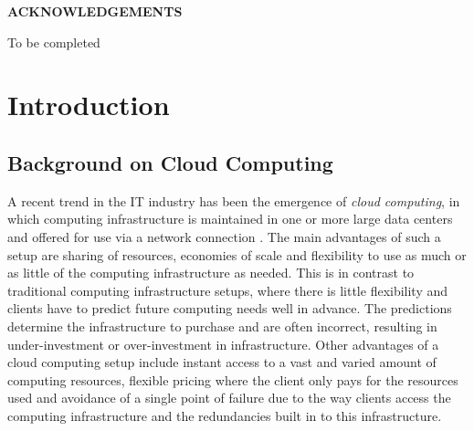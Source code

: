 \documentclass[12pt]{report}
\begin{document}
\setcounter{page}{2}

\newpage

\mbox{}

\newpage
\begin{center} \textbf{\large ACKNOWLEDGEMENTS} \end{center}
\bigskip
\noindent
To be completed

\newpage

\singlespacing

\tableofcontents

\setcounter{tocdepth}{2}

\listoftables

\listoffigures

\newpage
\renewcommand{\nomname}{Notation}
\printnomenclature

\newpage
{}

\chapter{Introduction}

\section{Background on Cloud Computing}

A recent trend in the IT industry has been the emergence of \textit{cloud computing}, in which computing infrastructure is maintained in one or more large data centers and offered for use via a network connection \cite{Interoute:WhatIsCloudComputing}.
The main advantages of such a setup are sharing of resources, economies of scale and flexibility to use as much or as little of the computing infrastructure as needed.
This is in contrast to traditional computing infrastructure setups, where there is little flexibility and clients have to predict future computing needs well in advance.
The predictions determine the infrastructure to purchase and are often incorrect, resulting in under-investment or over-investment in infrastructure.
Other advantages of a cloud computing setup include instant access to a vast and varied amount of computing resources, flexible pricing where the client only pays for the resources used and avoidance of a single point of failure due to the way clients access the computing infrastructure and the redundancies built in to this infrastructure.
\end{document}
